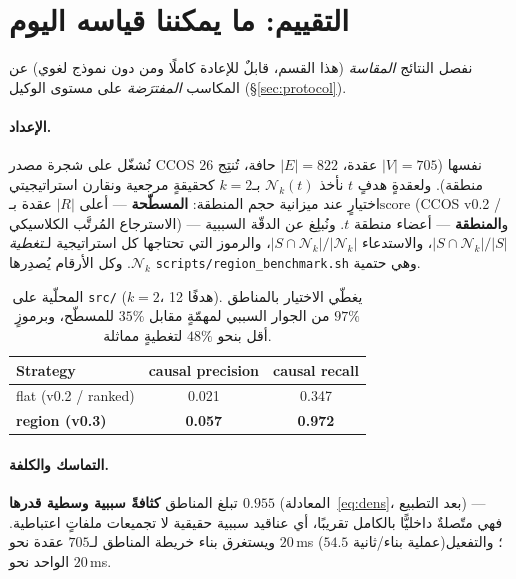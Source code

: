 \documentclass[11pt]{article}
\newcommand{\Nk}{\mathcal{N}_k}
\newcommand{\code}[1]{\textenglish{\texttt{#1}}}
\begin{document}
\section{التقييم: ما يمكننا قياسه اليوم}\label{sec:eval}

نفصل النتائج \emph{المقاسة} (هذا القسم، قابلٌ للإعادة كاملًا ومن دون نموذج لغوي) عن المكاسب
\emph{المفترَضة} على مستوى الوكيل (\S\ref{sec:protocol}).

\paragraph{الإعداد.} نُشغّل على شجرة مصدر CCOS نفسها ($|V|=705$ عقدة، $|E|=822$ حافة، تُنتِج
$26$ منطقة). ولعقدةٍ هدفٍ $t$ نأخذ $\Nk(t)$ بـ$k=2$ كحقيقةٍ مرجعية ونقارن استراتيجيتي
اختيارٍ عند ميزانية حجم المنطقة: \textbf{المسطّحة} --- أعلى $|R|$ عقدة بـ$\mathrm{score}$
(CCOS v0.2 / الاسترجاع المُرتَّب الكلاسيكي) --- و\textbf{المنطقة} --- أعضاء منطقة $t$. ونُبلِغ
عن الدقّة السببية $|S\cap\Nk|/|S|$، والاستدعاء $|S\cap\Nk|/|\Nk|$، والرموز التي تحتاجها كل
استراتيجية لـ\emph{تغطية} $\Nk$. وكل الأرقام يُصدِرها \code{scripts/region\_benchmark.sh}
وهي حتمية.

\begin{table}[h]
\centering
\begin{LTR}
\begin{tabular}{lcc}
\toprule
\textenglish{Strategy} & \textenglish{causal precision} & \textenglish{causal recall} \\
\midrule
\textenglish{flat (v0.2 / ranked)} & 0.021 & 0.347 \\
\textbf{\textenglish{region (v0.3)}} & \textbf{0.057} & \textbf{0.972} \\
\bottomrule
\end{tabular}
\end{LTR}
\caption{المحلّية على \code{src/} ($k=2$، 12 هدفًا). يغطّي الاختيار بالمناطق $97\%$ من
الجوار السببي لمهمّةٍ مقابل $35\%$ للمسطّح، وبرموزٍ أقل بنحو $48\%$ لتغطيةٍ مماثلة.}
\label{tab:locality}
\end{table}

\paragraph{التماسك والكلفة.} تبلغ المناطق \textbf{كثافةً سببية وسطية قدرها $0.955$}
(المعادلة~\ref{eq:dens}، بعد التطبيع) --- فهي متّصلةٌ داخليًّا بالكامل تقريبًا، أي عناقيد
سببية حقيقية لا تجميعات ملفاتٍ اعتباطية. ويستغرق بناء خريطة المناطق لـ$705$ عقدة نحو
$20$\,ms ($54.5$ عملية بناء/ثانية)؛ والتفعيل الواحد نحو $20$\,ms.
\end{document}
